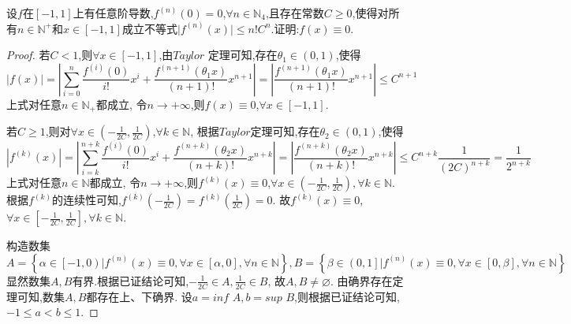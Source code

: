 \documentclass[lang=cn,newtx,10pt,scheme=chinese]{../Template/elegantbook}
\begin{document}
\begin{exercise}
    设\(f\)在\([-1,1]\)上有任意阶导数,\(f^{(n)}(0)=0\),\(\forall n\in\mathbb{N}_4\),且存在常数\(C\geq0\),使得对所有\(n\in\mathbb{N}^+\)和\(x\in[-1,1]\)成立不等式\(\vert f^{(n)}(x)\vert\leq n!C^{n}\).证明:\(f(x)\equiv0\).
    \begin{proof}
        若$C<1$,则$\forall x\in[-1,1]$,由$Taylor$ 定理可知,存在$\theta_1\in(0,1)$,使得
        \begin{equation}
            \left| f\left( x \right) \right|=\left| \sum_{i=0}^n{\frac{f^{\left( i \right)}\left( 0 \right)}{i!}x^i}+\frac{f^{\left( n+1 \right)}\left( \theta_1 x \right)}{\left( n+1 \right) !}x^{n+1} \right|=\left| \frac{f^{\left( n+1 \right)}\left( \theta_1 x \right)}{\left( n+1 \right) !}x^{n+1} \right|\leqslant C^{n+1}
            \nonumber
        \end{equation}
        上式对任意$n\in\mathbb{N} _+$都成立,
        令$n \to +\infty$,则$f(x)\equiv0$,$\forall x\in[-1,1]$.

        若$C\ge 1$,则对$\forall x\in(-\frac{1}{2C},\frac{1}{2C})$,$\forall k\in \mathbb{N}$,
        根据$Taylor$定理可知,存在$\theta_2\in(0,1)$,使得
        \begin{equation}
            \left| f^{\left( k \right)}\left( x \right) \right|=\left| \sum_{i=k}^{n+k}{\frac{f^{\left( i \right)}\left( 0 \right)}{i!}x^i}+\frac{f^{\left( n+k \right)}\left( \theta_2 x \right)}{\left( n+k \right) !}x^{n+k} \right|=\left| \frac{f^{\left( n+k \right)}\left( \theta_2 x \right)}{\left( n+k \right) !}x^{n+k} \right|\leqslant C^{n+k}\frac{1}{\left( 2C \right) ^{n+k}}=\frac{1}{2^{n+k}}
            \nonumber
        \end{equation}
        上式对任意$n\in\mathbb{N}$都成立,
        令$n\to+\infty$,则$f^{(k)}(x)\equiv0$,$\forall x\in(-\frac{1}{2C},\frac{1}{2C}),\forall k\in \mathbb{N}$.
        根据$f^{(k)}$的连续性可知,$f^{(k)}(-\frac{1}{2C})=f^{(k)}(\frac{1}{2C})=0$.
        故$f^{(k)}(x)\equiv0$,$\forall x\in[-\frac{1}{2C},\frac{1}{2C}],\forall k\in \mathbb{N}$.

        构造数集
        \begin{equation}
            A=\left\{ \alpha \in \left[ -1,0 \right) |f^{\left( n \right)}\left( x \right) \equiv 0,\forall x\in \left[ \alpha ,0 \right] ,\forall n\in \mathbb{N} \right\} ,B=\left\{ \beta \in \left( 0,1 \right] |f^{\left( n \right)}\left( x \right) \equiv 0,\forall x\in \left[ 0,\beta \right] ,\forall n\in \mathbb{N} \right\} 
            \nonumber
        \end{equation}
        显然数集$A,B$有界.根据已证结论可知,$-\frac{1}{2C}\in A,\frac{1}{2C}\in B$,
        故$A,B\ne \varnothing$.
        由确界存在定理可知,数集$A,B$都存在上、下确界.
        设$a=inf\,\,A,b=sup\,\,B$,则根据已证结论可知,$-1\le a<b\le 1$.
        

\end{proof}
\end{exercise}
\end{document}
